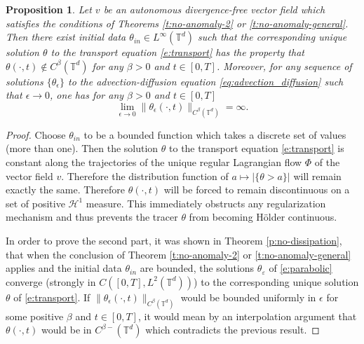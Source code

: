 \documentclass[11pt,reqno]{amsart}
\newtheorem{proposition}[theorem]{Proposition}
\theoremstyle{definition}
\numberwithin{equation}{section}
\begin{document}
\begin{proposition}\label{p:no-regularization}
Let $v$ be an autonomous divergence-free vector field which satisfies the conditions of Theorems \ref{t:no-anomaly-2} or \ref{t:no-anomaly-general}. Then there exist initial data $\theta_{in} \in L^\infty (\mathbb{T}^d)$ such that the corresponding unique solution $\theta$ to the transport equation \eqref{e:transport} has the property that $\theta (\cdot, t) \notin C^\beta (\mathbb{T}^d)$ for any $\beta > 0$ and $t \in [0,T]$. Moreover, for any sequence of solutions $\{ \theta_\epsilon \}$ to the advection-diffusion equation \eqref{eq:advection_diffusion} such that $\epsilon \rightarrow 0$, one has for any $\beta > 0$ and $t \in [0,T]$
\begin{equation}
\lim_{\epsilon \rightarrow 0} \lVert \theta_\epsilon (\cdot, t) \rVert_{C^\beta (\mathbb{T}^d)} = \infty.
\end{equation}
\end{proposition}
\begin{proof}
Choose $\theta_{in}$ to be a bounded function which takes a discrete set of values (more than one). Then the solution $\theta$ to the transport equation \eqref{e:transport} is constant along the trajectories of the unique regular Lagrangian flow $\Phi$ of the vector field $v$. Therefore the distribution function of $a\mapsto |\{\theta > a\}|$ will remain exactly the same. Therefore $\theta (\cdot, t)$ will be forced to remain discontinuous on a set of positive $\mathcal{H}^1$ measure. This immediately obstructs any regularization mechanism and thus prevents the tracer $\theta$ from becoming Hölder continuous.

In order to prove the second part, it was shown in Theorem \ref{p:no-dissipation}, that when the conclusion of Theorem \ref{t:no-anomaly-2} or \ref{t:no-anomaly-general} applies and the initial data $\theta_{in}$ are bounded, the solutions $\theta_\varepsilon$ of \eqref{e:parabolic} converge (strongly in $C ([0,T], L^2 (\mathbb{T}^d))$) to the corresponding unique 
solution $\theta$ of \eqref{e:transport}. If $\lVert \theta_\epsilon (\cdot, t) \rVert_{C^\beta (\mathbb{T}^d)}$ would be bounded uniformly in $\epsilon$ for some positive $\beta$ and $t \in [0,T]$, it would mean by an interpolation argument that $\theta (\cdot, t)$ would be in $C^{\beta-} (\mathbb{T}^d)$ which contradicts the previous result.
\end{proof}
\end{document}
